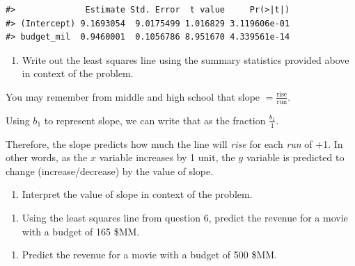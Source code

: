 \documentclass[
]{report}
\providecommand{\tightlist}{%
  \setlength{\itemsep}{0pt}\setlength{\parskip}{0pt}}
\begin{document}
\begin{verbatim}
#>              Estimate Std. Error  t value     Pr(>|t|)
#> (Intercept) 9.1693054  9.0175499 1.016829 3.119606e-01
#> budget_mil  0.9460001  0.1056786 8.951670 4.339561e-14
\end{verbatim}

\begin{enumerate}
\def\labelenumi{\arabic{enumi}.}
\setcounter{enumi}{5}
\tightlist
\item
  Write out the least squares line using the summary statistics provided above in context of the problem.
\end{enumerate}

\vspace{.5in}

You may remember from middle and high school that slope \(=\frac{\mbox{rise}}{\mbox{run}}\).

Using \(b_1\) to represent slope, we can write that as the fraction \(\frac{b_1}{1}\).

Therefore, the slope predicts how much the line will \emph{rise} for each \emph{run} of +1. In other words, as the \(x\) variable increases by 1 unit, the \(y\) variable is predicted to change (increase/decrease) by the value of slope.

\begin{enumerate}
\def\labelenumi{\arabic{enumi}.}
\setcounter{enumi}{6}
\tightlist
\item
  Interpret the value of slope in context of the problem.
\end{enumerate}

\vspace{.8in}

\begin{enumerate}
\def\labelenumi{\arabic{enumi}.}
\setcounter{enumi}{7}
\tightlist
\item
  Using the least squares line from question 6, predict the revenue for a movie with a budget of 165 \$MM.
\end{enumerate}

\vspace{.6in}

\begin{enumerate}
\def\labelenumi{\arabic{enumi}.}
\setcounter{enumi}{8}
\tightlist
\item
  Predict the revenue for a movie with a budget of 500 \$MM.
\end{enumerate}

\vspace{0.8in}
\end{document}
